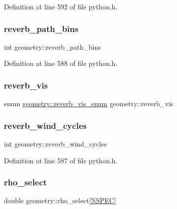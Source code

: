 Definition at line 592 of file python.\+h.

\mbox{\label{structgeometry_a1d77d068ab2cd8167969ac1058d67b20}} 
\subsubsection{\texorpdfstring{reverb\+\_\+path\+\_\+bins}{reverb\_path\_bins}}
{\footnotesize\ttfamily int geometry\+::reverb\+\_\+path\+\_\+bins}



Definition at line 588 of file python.\+h.

\mbox{\label{structgeometry_ad4786d21c40cfe12de994e26895343ad}} 
\subsubsection{\texorpdfstring{reverb\+\_\+vis}{reverb\_vis}}
{\footnotesize\ttfamily enum \hyperlink{structgeometry_a335f65b5ed9d32c11f5ecd108969dae2}{geometry\+::reverb\+\_\+vis\+\_\+enum}  geometry\+::reverb\+\_\+vis}

\mbox{\label{structgeometry_a2cc86681d871e4f85cdf454702748d8c}} 
\subsubsection{\texorpdfstring{reverb\+\_\+wind\+\_\+cycles}{reverb\_wind\_cycles}}
{\footnotesize\ttfamily int geometry\+::reverb\+\_\+wind\+\_\+cycles}



Definition at line 587 of file python.\+h.

\mbox{\label{structgeometry_ad91f1041aaf45a72a4d2c67de476848f}} 
\subsubsection{\texorpdfstring{rho\+\_\+select}{rho\_select}}
{\footnotesize\ttfamily double geometry\+::rho\+\_\+select\mbox{[}\hyperlink{python_8h_ade1df1cb82ae4ef9a5c0cddb37d9a73b}{N\+S\+P\+EC}\mbox{]}}



